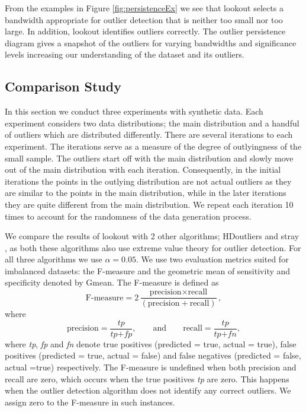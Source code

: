 \documentclass[12pt]{article}
\theoremstyle{definition}
\theoremstyle{definition}
\theoremstyle{definition}
\theoremstyle{remark}
\begin{document}
From the examples in Figure \ref{fig:persistenceEx} we see that lookout selects a bandwidth appropriate for outlier detection that is neither too small nor too large. In addition, lookout identifies outliers correctly. The outlier persistence diagram gives a snapshot of the outliers for varying bandwidths and significance levels increasing our understanding of the dataset and its outliers.

\hypertarget{sec:SyntheticComparison}{%
\subsection{Comparison Study}\label{sec:SyntheticComparison}}

In this section we conduct three experiments with synthetic data. Each experiment considers two data distributions; the main distribution and a handful of outliers which are distributed differently. There are several iterations to each experiment. The iterations serve as a measure of the degree of outlyingness of the small sample. The outliers start off with the main distribution and slowly move out of the main distribution with each iteration. Consequently, in the initial iterations the points in the outlying distribution are not actual outliers as they are similar to the points in the main distribution, while in the later iterations they are quite different from the main distribution. We repeat each iteration 10 times to account for the randomness of the data generation process.

We compare the results of lookout with 2 other algorithms; HDoutliers \citep{wilkinson2017visualizing} and stray \citep{stray}, as both these algorithms also use extreme value theory for outlier detection. For all three algorithms we use \(\alpha = 0.05\). We use two evaluation metrics suited for imbalanced datasets: the F-measure and the geometric mean of sensitivity and specificity denoted by Gmean. The F-measure is defined as
\begin{equation}\label{eq:fmeasure}
    \text{F-measure} = 2\frac{\text{precision} \times \text{recall}}{\left( \text{precision} + \text{recall} \right) }  ,
\end{equation}
where
\begin{equation}\label{eq:pr}
    \text{precision} = \frac{ \textit{tp} }{\textit{tp} + \textit{fp}}  , \qquad \text{and} \qquad \text{recall} = \frac{\textit{tp}}{\textit{tp} + \textit{fn}}  ,
\end{equation}
where \emph{tp}, \emph{fp} and \emph{fn} denote true positives (predicted = true, actual = true), false positives (predicted = true, actual = false) and false negatives (predicted = false, actual =true) respectively. The F-measure is undefined when both precision and recall are zero, which occurs when the true positives \emph{tp} are zero. This happens when the outlier detection algorithm does not identify any correct outliers. We assign zero to the F-measure in such instances.
\end{document}
